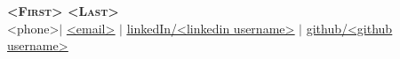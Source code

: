 \documentclass[]{resume-openfont}
\begin{document}
\newcommand{\yourName}{<First> <Last>}
\newcommand{\yourWebsite}{<website>}
\newcommand{\yourEmail}{<email>}
\newcommand{\yourPhone}{<phone>}
\newcommand{\githubUserName}{<github username>}
\newcommand{\linkedInUserName}{<linkedin username>}


\begin{center}
    \textbf{\Huge \scshape \yourName} \\ \vspace{1pt}
    \small \yourPhone $|$ \href{mailto:\yourEmail}{\underline{\yourEmail}} $|$ 
    \href{https://linkedin.com/in/\linkedInUserName}{\underline{linkedIn/\linkedInUserName}} $|$
    \href{https://github.com/\githubUserName}{\underline{github/\githubUserName}}
\end{center}
\end{document}
